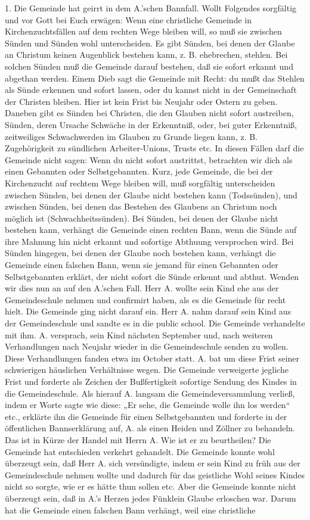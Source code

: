 1. Die Gemeinde hat geirrt in dem A.’schen Bannfall. Wollt Folgendes sorgfältig und vor Gott bei Euch erwägen: Wenn eine christliche Gemeinde in Kirchenzuchtsfällen auf dem rechten Wege bleiben will, so muß sie zwischen Sünden und Sünden wohl unterscheiden. Es gibt Sünden, bei denen der Glaube an Christum keinen Augenblick bestehen kann, z. B. ehebrechen, stehlen. Bei solchen Sünden muß die Gemeinde darauf bestehen, daß sie sofort erkannt und abgethan werden. Einem Dieb sagt die Gemeinde mit Recht: du mußt das Stehlen als Sünde erkennen und sofort lassen, oder du kannst nicht in der Gemeinschaft der Christen bleiben. Hier ist kein Frist bis Neujahr oder Ostern zu geben. Daneben gibt es Sünden bei Christen, die den Glauben nicht sofort austreiben, Sünden, deren Ursache Schwäche in der Erkenntniß, oder, bei guter Erkenntniß, zeitweiliges Schwachwerden im Glauben zu Grunde liegen kann, z. B. Zugehörigkeit zu sündlichen Arbeiter-Unions, Trusts etc. In diesen Fällen darf die Gemeinde nicht sagen: Wenn du nicht sofort austrittst, betrachten wir dich als einen Gebannten oder Selbstgebannten. Kurz, jede Gemeinde, die bei der Kirchenzucht auf rechtem Wege bleiben will, muß sorgfältig unterscheiden zwischen Sünden, bei denen der Glaube nicht bestehen kann (Todssünden), und zwischen Sünden, bei denen das Bestehen des Glaubens an Christum noch möglich ist (Schwachheitssünden). Bei Sünden, bei denen der Glaube nicht bestehen kann, verhängt die Gemeinde einen rechten Bann, wenn die Sünde auf ihre Mahnung hin nicht erkannt und sofortige Abthuung versprochen wird. Bei Sünden hingegen, bei denen der Glaube noch bestehen kann, verhängt die Gemeinde einen falschen Bann, wenn sie jemand für einen Gebannten oder Selbstgebannten erklärt, der nicht sofort die Sünde erkennt und abthut. Wenden wir dies nun an auf den A.’schen Fall. Herr A. wollte sein Kind ehe aus der Gemeindeschule nehmen und confirmirt haben, als es die Gemeinde für recht hielt. Die Gemeinde ging nicht darauf ein. Herr A. nahm darauf sein Kind aus der Gemeindeschule und sandte es in die public school. Die Gemeinde verhandelte mit ihm. A. versprach, sein Kind nächsten September und, nach weiteren Verhandlungen nach Neujahr wieder in die Gemeindeschule senden zu wollen. Diese Verhandlungen fanden etwa im October statt. A. bat um diese Frist seiner schwierigen häuslichen Verhältnisse wegen. Die Gemeinde verweigerte jegliche Frist und forderte als Zeichen der Bußfertigkeit sofortige Sendung des Kindes in die Gemeindeschule. Als hierauf A. langsam die Gemeindeversammlung verließ, indem er Worte sagte wie diese: „Er sehe, die Gemeinde wolle ihn los werden“ etc., erklärte ihn die Gemeinde für einen Selbstgebannten und forderte in der öffentlichen Bannserklärung auf, A. als einen Heiden und Zöllner zu behandeln. Das ist in Kürze der Handel mit Herrn A. Wie ist er zu beurtheilen? Die Gemeinde hat entschieden verkehrt gehandelt. Die Gemeinde konnte wohl überzeugt sein, daß Herr A. sich versündigte, indem er sein Kind zu früh aus der Gemeindeschule nehmen wollte und dadurch für das geistliche Wohl seines Kindes nicht so sorgte, wie er es hätte thun sollen etc. Aber die Gemeinde konnte nicht überzeugt sein, daß in A.’s Herzen jedes Fünklein Glaube erloschen war. Darum hat die Gemeinde einen falschen Bann verhängt, weil eine christliche 